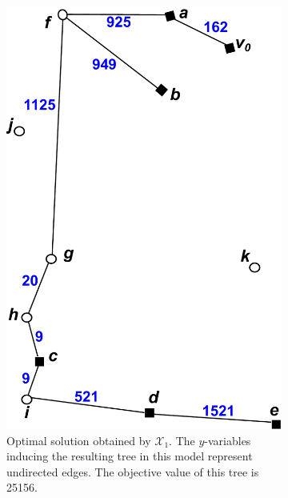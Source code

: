 \begin{figure}[!htb]
    \centering
    \begin{subfigure}[b]{0.4\textwidth}
        \includegraphics[width=\textwidth]{conBNec}
        \caption{Optimal solution obtained by $\mathcal{X}_1$. The $y$-variables inducing the resulting tree in this model represent undirected edges. The objective value of this tree is 25156.\newline~}
        \label{fig:BorigSMT}
    \end{subfigure}
    \hfill
    \begin{subfigure}[b]{0.4\textwidth}

\end{subfigure}
\end{figure}
